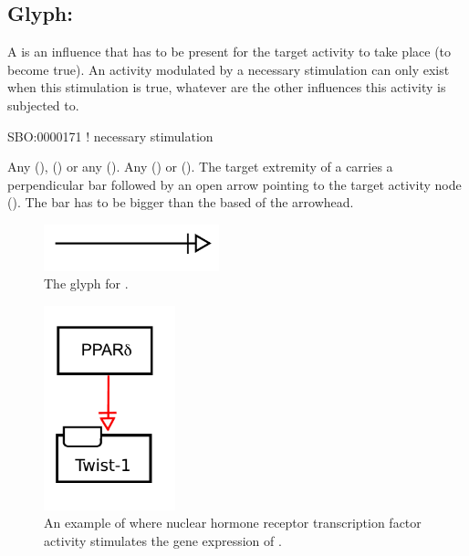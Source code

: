 \subsection{Glyph: }
\label{sec:af:trigger}
A  is an influence that has to be present for the target activity to take place (to become true).  An activity modulated by a necessary stimulation can only exist when this stimulation is true, whatever are the other influences this activity is subjected to.

\begin{glyphDescription}

\glyphSboTerm SBO:0000171 ! necessary stimulation

  \glyphOrigin Any  (),   () or any  ().
 \glyphTarget Any  () or  ().
 \glyphEndPoint The target extremity of a  carries a perpendicular bar followed by an open arrow pointing to the target activity node ().  The bar has to be bigger than the based of the arrowhead.

\end{glyphDescription}

\begin{figure}[H]
  \centering
  \includegraphics[width = 2in]{images/necessaryStimulation}
  \caption{The \AF glyph for .}
  \label{fig:af:trigger}
\end{figure}

\begin{figure}[H]
  \centering
  \includegraphics[width = 1.5in]{examples/ex-necessaryStimulation}
  \caption{An example of  where nuclear hormone receptor  transcription factor activity stimulates the gene expression of . }
  \label{fig:af:ex-NS}
\end{figure}
